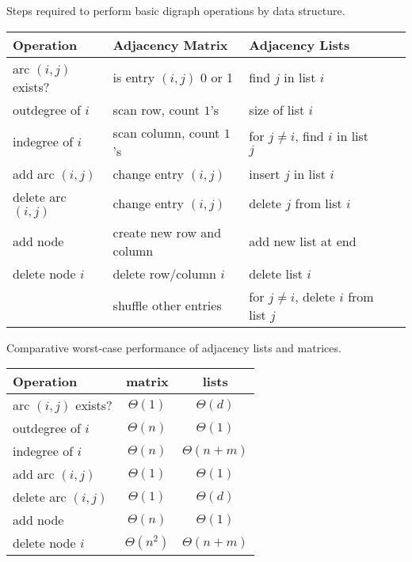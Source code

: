 \begin{samepage}
\begin{center}
Steps required to perform basic digraph operations by data structure.

\begin{tabular}{|l|l|l|l|l|}
\hline

\textbf{Operation} & \textbf{Adjacency Matrix} & \textbf{Adjacency Lists} \\
\hline

arc $(i, j)$ exists? & is entry $(i,j)$ 0 or 1  & find $j$ in  list $i$ \\
\hline
outdegree  of $i$ & scan row, count $1$'s & size of  list  $i$\\
\hline
indegree of $i$ & scan column,  count $1$'s & for $j\neq i$, find $i$ in list $j$ \\
\hline
add arc $(i, j)$ & change entry $(i ,j)$ & insert $j$ in list $i$ \\
\hline
delete arc $(i, j)$ & change entry $(i ,j)$ & delete $j$ from list $i$ \\
\hline
add node & create new row and column & add new list at end\\
\hline
delete node $i$ & delete row/column $i$  & delete list $i$ \\
& shuffle other entries & for $j\neq i$, delete  $i$ from list $j$ \\ 
\hline
\end{tabular}
\end{center}
\end{samepage}


\begin{samepage}
\begin{center}
Comparative worst-case performance of adjacency lists and matrices.

\begin{tabular}{|l|c|c|}
\hline

\textbf{Operation} 	& \textbf{matrix} & \textbf{lists} \\
\hline

arc $(i, j)$ exists? & $\Theta(1)$  & $\Theta(d)$ \\
\hline
outdegree  of $i$ 	& $\Theta(n)$ & $\Theta(1)$ \\
\hline
indegree of $i$ 	& $\Theta(n)$ &  $\Theta(n+m)$ \\
\hline
add arc $(i, j)$ 	& $\Theta(1)$ & $\Theta(1)$  \\
\hline
delete arc $(i, j)$ & $\Theta(1)$  & $\Theta(d)$  \\
\hline
add node 			& $\Theta(n)$ & $\Theta(1)$  \\
\hline
delete node $i$ 	& $\Theta(n^2)$  & $\Theta(n+m)$  \\
\hline
\end{tabular}
\end{center}
\end{samepage}

